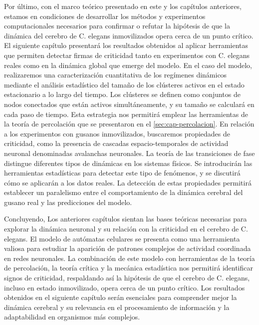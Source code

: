 Por último, con el marco teórico presentado en este y los capítulos anteriores, estamos en condiciones de desarrollar los métodos y experimentos computacionales necesarios para confirmar o refutar la hipótesis de que la dinámica del cerebro de C. elegans inmovilizados opera cerca de un punto crítico. El siguiente capítulo presentará los resultados obtenidos al aplicar herramientas que permiten detectar firmas de criticidad tanto en experimentos con C. elegans reales como en la dinámica global que emerge del modelo. En el caso del modelo, realizaremos una caracterización cuantitativa de los regímenes dinámicos mediante el análisis estadístico del tamaño de los clústeres activos en el estado estacionario a lo largo del tiempo. Los clústeres se definen como conjuntos de nodos conectados que están activos simultáneamente, y su tamaño se calculará en cada paso de tiempo. Esta estrategia nos permitirá emplear las herramientas de la teoría de percolación que se presentaron en el \cref{sec:cap-percolacion}. En relación a los experimentos con gusanos inmovilizados, buscaremos propiedades de criticidad, como la presencia de cascadas espacio-temporales de actividad neuronal denominadas avalanchas neuronales.   La teoría de las transiciones de fase distingue diferentes tipos de dinámicas en los sistemas físicos. Se introducirán las herramientas estadísticas para detectar este tipo de fenómenos, y se discutirá cómo se aplicarán a los datos reales.   La detección de estas propiedades permitirá establecer un paralelismo entre el comportamiento de la dinámica cerebral del gusano real y las predicciones del modelo.

	
Concluyendo, Los anteriores capítulos sientan las bases teóricas necesarias para explorar la dinámica neuronal y su relación con la criticidad en el cerebro de C. elegans. El modelo de autómatas celulares se presenta como una herramienta valiosa para estudiar la aparición de patrones complejos de actividad coordinada en redes neuronales. La combinación de este modelo con herramientas de la teoría de percolación, la teoría crítica y la mecánica estadística nos permitirá identificar signos de criticidad, respaldando así la hipótesis de que el cerebro de C. elegans, incluso en estado inmovilizado, opera cerca de un punto crítico. Los resultados obtenidos en el siguiente capítulo serán esenciales para comprender mejor la dinámica cerebral y su relevancia en el procesamiento de información y la adaptabilidad en organismos más complejos.




















